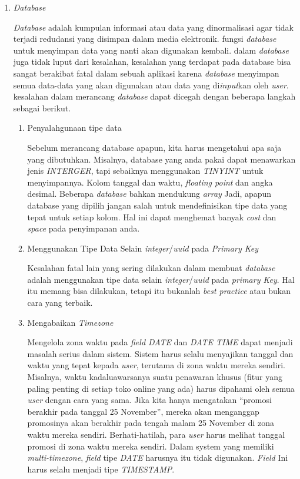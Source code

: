 \begin{enumerate}
\item \textit{Database}
\par
\textit{Database} adalah kumpulan informasi atau data yang dinormalisasi agar tidak terjadi redudansi yang disimpan dalam media elektronik. fungsi \textit{database} untuk menyimpan data yang nanti akan digunakan kembali. dalam \textit{database} juga tidak luput dari kesalahan, kesalahan yang terdapat pada database bisa sangat berakibat fatal dalam sebuah aplikasi karena \textit{database} menyimpan semua data-data yang akan digunakan atau data yang di\textit{input}kan oleh \textit{user}. kesalahan dalam merancang \textit{database} dapat dicegah dengan beberapa langkah sebagai berikut.
\begin{enumerate}
\item Penyalahgunaan tipe data
\par 
Sebelum merancang database apapun, kita harus mengetahui apa saja yang dibutuhkan. Misalnya, database yang anda pakai dapat menawarkan jenis \textit{INTERGER}, tapi sebaiknya menggunakan \textit{TINYINT} untuk menyimpannya. Kolom tanggal dan waktu, \textit{floating point} dan angka desimal. Beberapa \textit{database} bahkan mendukung \textit{array} Jadi, apapun database yang dipilih jangan salah  untuk mendefinisikan tipe data yang tepat untuk setiap kolom. Hal ini dapat menghemat banyak \textit{cost} dan \textit{space} pada penyimpanan anda.
\item Menggunakan Tipe Data Selain \textit{integer}/\textit{uuid} pada \textit{Primary Key} 
\par
Kesalahan fatal lain yang sering dilakukan dalam membuat \textit{database} adalah menggunakan tipe data selain \textit{integer}/\textit{uuid} pada \textit{primary Key}. Hal itu memang bisa dilakukan, tetapi itu bukanlah \textit{best practice} atau bukan cara yang terbaik.
\item Mengabaikan \textit{Timezone}
\par 
Mengelola zona waktu pada \textit{field DATE} dan \textit{DATE TIME} dapat menjadi masalah serius dalam sistem. Sistem harus selalu menyajikan tanggal dan waktu yang tepat kepada \textit{user}, terutama di zona waktu mereka sendiri. Misalnya, waktu kadaluawarsanya suatu penawaran khusus (fitur yang paling penting di setiap toko online yang ada) harus dipahami oleh semua \textit{user} dengan cara yang sama. Jika kita hanya mengatakan “promosi berakhir pada tanggal 25 November”, mereka akan menganggap promosinya akan berakhir pada tengah malam 25 November di zona waktu mereka sendiri. Berhati-hatilah, para \textit{user} harus melihat tanggal promosi di zona waktu mereka sendiri. Dalam system yang memiliki \textit{multi-timezone}, \textit{field} tipe \textit{DATE} harusnya itu tidak digunakan. \textit{Field} Ini harus selalu menjadi tipe \textit{TIMESTAMP}.

\end{enumerate}
\end{enumerate}
